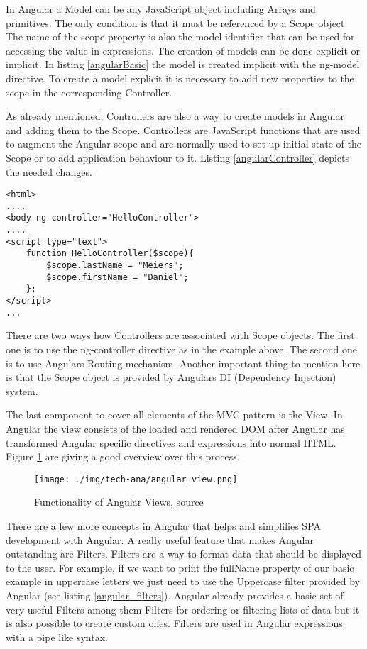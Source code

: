 In Angular a Model can be any JavaScript object including Arrays  and primitives.
The only condition is that it must be referenced by a Scope  object.
The name of the scope property is also the model identifier that can be used for accessing the value in expressions.
The creation of models can be done explicit or implicit.
In listing \ref{angularBasic} the model is created implicit with the ng-model directive.
To create a model explicit it is necessary to add new properties to the scope in the corresponding Controller.

As already mentioned, Controllers are also a way to create models in Angular and adding them to the Scope.
Controllers are JavaScript functions that are used to augment the Angular scope and are normally used to set up initial state of the Scope or to add application behaviour to it.
Listing \ref{angularController} depicts the needed changes.
\begin{lstlisting}[label=angularController,caption=Angular Controller]
<html>
....
<body ng-controller="HelloController">
....
<script type="text">
	function HelloController($scope){
	    $scope.lastName = "Meiers";
	    $scope.firstName = "Daniel";
	};
</script>
...
\end{lstlisting}

There are two ways how Controllers are associated with Scope objects.
The first one is to use the ng-controller directive as in the example above.
The second one is to use Angulars Routing mechanism.
Another important thing to mention here  is that the Scope object is provided by Angulars DI (Dependency Injection) system.
  

The last component to cover all elements of the MVC pattern is the View.
In Angular the view consists of the loaded and rendered DOM after Angular has transformed Angular specific directives and expressions into normal HTML.
Figure \ref{fig:angular_views} are giving a good overview over this process.
  
\begin{figure}
	\centering	
	\texttt{[image: ./img/tech-ana/angular\_view.png]}
	\caption{Functionality of Angular Views, source \autocite{tech-ana:ng-concepts}}
	\label{fig:angular_views}
\end{figure} 

There are a few more concepts in Angular that helps and simplifies SPA development with Angular.
A really useful feature that makes Angular outstanding are Filters.
Filters are a way to format data that should be displayed to the user.
For example, if we want to print the fullName property of our basic example in uppercase letters we just need to use the Uppercase filter provided by Angular (see listing \ref{angular_filters}).
Angular already provides a basic set of very useful Filters among them Filters for ordering or filtering lists of data but it is also possible to create custom ones.
Filters are used in Angular expressions with a pipe like syntax.


